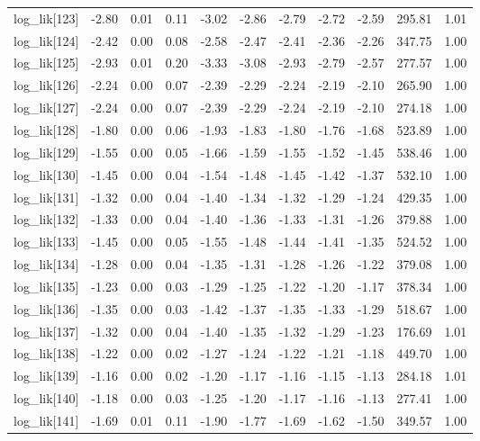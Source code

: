 \begin{table}[ht]
\begin{tabular}{rrrrrrrrrrr}
  log\_lik[123] & -2.80 & 0.01 & 0.11 & -3.02 & -2.86 & -2.79 & -2.72 & -2.59 & 295.81 & 1.01 \\ 
  log\_lik[124] & -2.42 & 0.00 & 0.08 & -2.58 & -2.47 & -2.41 & -2.36 & -2.26 & 347.75 & 1.00 \\ 
  log\_lik[125] & -2.93 & 0.01 & 0.20 & -3.33 & -3.08 & -2.93 & -2.79 & -2.57 & 277.57 & 1.00 \\ 
  log\_lik[126] & -2.24 & 0.00 & 0.07 & -2.39 & -2.29 & -2.24 & -2.19 & -2.10 & 265.90 & 1.00 \\ 
  log\_lik[127] & -2.24 & 0.00 & 0.07 & -2.39 & -2.29 & -2.24 & -2.19 & -2.10 & 274.18 & 1.00 \\ 
  log\_lik[128] & -1.80 & 0.00 & 0.06 & -1.93 & -1.83 & -1.80 & -1.76 & -1.68 & 523.89 & 1.00 \\ 
  log\_lik[129] & -1.55 & 0.00 & 0.05 & -1.66 & -1.59 & -1.55 & -1.52 & -1.45 & 538.46 & 1.00 \\ 
  log\_lik[130] & -1.45 & 0.00 & 0.04 & -1.54 & -1.48 & -1.45 & -1.42 & -1.37 & 532.10 & 1.00 \\ 
  log\_lik[131] & -1.32 & 0.00 & 0.04 & -1.40 & -1.34 & -1.32 & -1.29 & -1.24 & 429.35 & 1.00 \\ 
  log\_lik[132] & -1.33 & 0.00 & 0.04 & -1.40 & -1.36 & -1.33 & -1.31 & -1.26 & 379.88 & 1.00 \\ 
  log\_lik[133] & -1.45 & 0.00 & 0.05 & -1.55 & -1.48 & -1.44 & -1.41 & -1.35 & 524.52 & 1.00 \\ 
  log\_lik[134] & -1.28 & 0.00 & 0.04 & -1.35 & -1.31 & -1.28 & -1.26 & -1.22 & 379.08 & 1.00 \\ 
  log\_lik[135] & -1.23 & 0.00 & 0.03 & -1.29 & -1.25 & -1.22 & -1.20 & -1.17 & 378.34 & 1.00 \\ 
  log\_lik[136] & -1.35 & 0.00 & 0.03 & -1.42 & -1.37 & -1.35 & -1.33 & -1.29 & 518.67 & 1.00 \\ 
  log\_lik[137] & -1.32 & 0.00 & 0.04 & -1.40 & -1.35 & -1.32 & -1.29 & -1.23 & 176.69 & 1.01 \\ 
  log\_lik[138] & -1.22 & 0.00 & 0.02 & -1.27 & -1.24 & -1.22 & -1.21 & -1.18 & 449.70 & 1.00 \\ 
  log\_lik[139] & -1.16 & 0.00 & 0.02 & -1.20 & -1.17 & -1.16 & -1.15 & -1.13 & 284.18 & 1.01 \\ 
  log\_lik[140] & -1.18 & 0.00 & 0.03 & -1.25 & -1.20 & -1.17 & -1.16 & -1.13 & 277.41 & 1.00 \\ 
  log\_lik[141] & -1.69 & 0.01 & 0.11 & -1.90 & -1.77 & -1.69 & -1.62 & -1.50 & 349.57 & 1.00 \\ 

\end{tabular}
\end{table}
